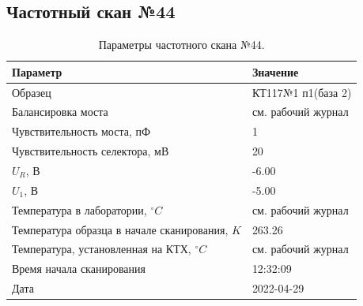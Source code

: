 \subsection{Частотный скан №44}
\begin{table}[!ht]
    \centering
    \caption{Параметры частотного скана №44.}
    \begin{tabular}{|l|l|}
        \hline
        Параметр                                       & Значение                  \\ \hline
        Образец                                        & КТ117№1 п1(база 2)        \\ \hline
        Балансировка моста                             & см. рабочий журнал        \\ \hline
        Чувствительность моста, пФ                     & 1                         \\ \hline
        Чувствительность селектора, мВ                 & 20                        \\ \hline
        $U_R$, В                                       & -6.00                     \\ \hline
        $U_1$, В                                       & -5.00                     \\ \hline
        Температура в лаборатории, $^\circ C$          & см. рабочий журнал        \\ \hline
        Температура образца в начале сканирования, $K$ & 263.26                    \\ \hline
        Температура, установленная на КТХ, $^\circ C$  & см. рабочий журнал        \\ \hline
        Время начала сканирования                      & 12:32:09                  \\ \hline
        Дата                                           & 2022-04-29                \\ \hline
    \end{tabular}
    \label{table:frequency_scan_44}
\end{table}

